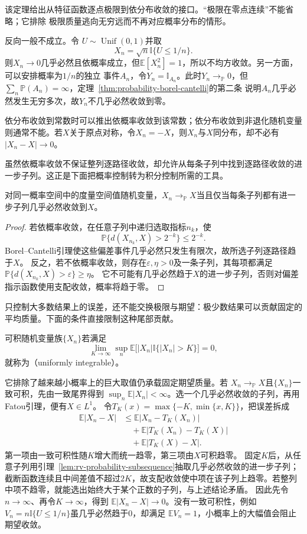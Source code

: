 该定理给出从特征函数逐点极限到依分布收敛的接口。“极限在零点连续”不能省略；它排除
极限质量逃向无穷远而不再对应概率分布的情形。

反向一般不成立。令
\(U\sim\operatorname{Unif}(0,1)\)并取
\[ X_n=\sqrt{n}\mathbb{I}\{U\leq1/n\}. \]
则\(X_n\to0\)几乎必然且依概率成立，但\(\mathbb{E}[X_n^2]=1\)，所以不均方收敛。另一方面，可以安排概率为\(1/n\)的独立
事件\(A_n\)，令\(Y_n=\mathbb{I}_{A_n}\)。此时\(Y_n\to_{\mathbb{P}}0\)，但
\(\sum_n\mathbb{P}(A_n)=\infty\)，定理~\ref{thm:probability-borel-cantelli}的第二条
说明\(A_n\)几乎必然发生无穷多次，故\(Y_n\)不几乎必然收敛到零。

依分布收敛到常数时可以推出依概率收敛到该常数；依分布收敛到非退化随机变量则通常不能。若\(X\)关于原点对称，令\(X_n=-X\)，则\(X_n\)与\(X\)同分布，却不必有\(|X_n-X|\to0\)。

虽然依概率收敛不保证整列逐路径收敛，却允许从每条子列中找到逐路径收敛的进一步子列。这正是下面把概率控制转为积分控制所需的工具。
\begin{lemma}[依概率收敛的子列判据]
 \label{lem:rv-probability-subsequence}
 对同一概率空间中的度量空间值随机变量，\(X_n\to_{\mathbb P}X\)当且仅当每条子列都有进一步子列几乎必然收敛到\(X\)。
\end{lemma}
\begin{proof}
若依概率收敛，在任意子列中递归选取指标\(n_k\)，使
\[
  \mathbb P\{d(X_{n_k},X)>2^{-k}\}\leq2^{-k}.
\]
Borel--Cantelli引理使这些偏差事件几乎必然只发生有限次，故所选子列逐路径趋于\(X\)。
反之，若不依概率收敛，则存在\(\varepsilon,\eta>0\)及一条子列，其每项都满足
\(\mathbb P\{d(X_{n_k},X)>\varepsilon\}\geq\eta\)。
它不可能有几乎必然趋于\(X\)的进一步子列，否则对偏差指示函数使用支配收敛，概率将趋于零。
\end{proof}

只控制大多数结果上的误差，还不能交换极限与期望：极少数结果可以贡献固定的平均质量。下面的条件直接限制这种尾部贡献。
\begin{definition}[一致可积]
  \label{def:probability-uniform-integrability}
可积随机变量族\(\{X_n\}\)若满足
\[
  \lim_{K\to\infty}
  \sup_n\mathbb{E}\bigl[
    |X_n|\mathbb{I}\{|X_n|>K\}
  \bigr]=0,
\]
就称为（uniformly integrable）。
\end{definition}
它排除了越来越小概率上的巨大取值仍承载固定期望质量。若
\(X_n\to_{\mathbb P}X\)且\(\{X_n\}\)一致可积，先由一致尾界得到
\(\sup_n\mathbb E|X_n|<\infty\)。选一个几乎必然收敛的子列，再用Fatou引理，便有\(X\in L^1\)。
令\(T_K(x)=\max\{-K,\min\{x,K\}\}\)，把误差拆成
\[
\begin{aligned}
\mathbb E|X_n-X|
 &\leq\mathbb E|X_n-T_K(X_n)|\\
 &\quad+\mathbb E|T_K(X_n)-T_K(X)|\\
 &\quad+\mathbb E|T_K(X)-X|.
\end{aligned}
\]
第一项由一致可积性随\(K\)增大而统一趋零，第三项由\(X\)可积趋零。
固定\(K\)后，从任意子列用引理~\ref{lem:rv-probability-subsequence}抽取几乎必然收敛的进一步子列；截断函数连续且中间差值不超过\(2K\)，故支配收敛使中项在该子列上趋零。若整列中项不趋零，就能选出始终大于某个正数的子列，与上述结论矛盾。
因此先令\(n\to\infty\)、再令\(K\to\infty\)，得到
\(\mathbb E|X_n-X|\to0\)。没有一致可积性，例如
\(V_n=n\mathbb{I}\{U\leq1/n\}\)虽几乎必然趋于\(0\)，却满足
\(\mathbb{E}V_n=1\)，小概率上的大幅值会阻止期望收敛。

